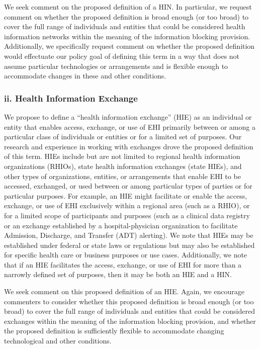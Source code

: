 \documentclass[twoside,11pt]{article}
\begin{document}
          We seek comment on the proposed definition of a HIN. In particular, we request comment on whether the proposed definition is broad enough (or too broad) to cover the full range of individuals and entities that could be considered health information networks within the meaning of the information blocking provision. Additionally, we specifically request comment on whether the proposed definition would effectuate our policy goal of defining this term in a way that does not assume particular technologies or arrangements and is flexible enough to accommodate changes in these and other conditions.


          \subsubsection{ii. Health Information Exchange}

          We propose to define a “health information exchange” (HIE) as an individual or entity that enables access, exchange, or use of EHI primarily between or among a particular class of individuals or entities or for a limited set of purposes. Our research and experience in working with exchanges drove the proposed definition of this term. HIEs include but are not limited to regional health information organizations (RHIOs), state health information exchanges (state HIEs), and other types of organizations, entities, or arrangements that enable EHI to be accessed, exchanged, or used between or among particular types of parties or for particular purposes. For example, an HIE might facilitate or enable the access, exchange, or use of EHI exclusively within a regional area (such as a RHIO), or for a limited scope of participants and purposes (such as a clinical data registry or an exchange established by a hospital-physician organization to facilitate Admission, Discharge, and Transfer (ADT) alerting). We note that HIEs may be established under federal or state laws or regulations but may also be established for specific health care or business purposes or use cases. Additionally, we note that if an HIE facilitates the access, exchange, or use of EHI for more than a narrowly defined set of purposes, then it may be both an HIE and a HIN.


          We seek comment on this proposed definition of an HIE. Again, we encourage commenters to consider whether this proposed definition is broad enough (or too broad) to cover the full range of individuals and entities that could be considered exchanges within the meaning of the information blocking provision, and whether the proposed definition is sufficiently flexible to accommodate changing technological and other conditions.
\end{document}
